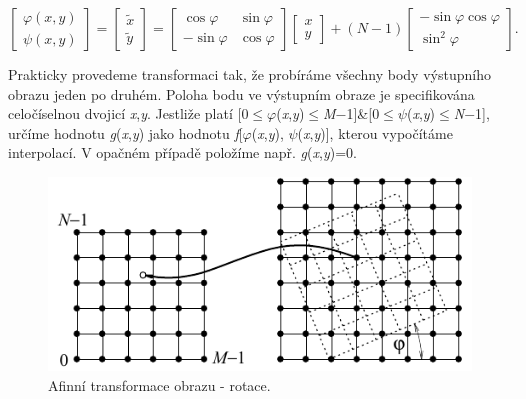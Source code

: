 \begin{equation}
    \left[\begin{array}{c} {\varphi \left(x,y\right)} \\ {\psi \left(x,y\right)} \end{array}\right]=\left[\begin{array}{c} {\tilde{x}} \\ {\tilde{y}} \end{array}\right]=\left[\begin{array}{cc} {\cos \varphi } & {\sin \varphi } \\ {-\sin \varphi } & {\cos \varphi } \end{array}\right]\left[\begin{array}{c} {x} \\ {y} \end{array}\right]+\left(N-1\right)\left[\begin{array}{c} {-\sin \varphi \cos \varphi } \\ {\sin ^{2} \varphi } \end{array}\right]. \nonumber
\end{equation}

Prakticky provedeme transformaci tak, že probíráme všechny body výstupního obrazu jeden po druhém. Poloha bodu ve výstupním obraze je specifikována celočíselnou dvojicí \textit{x},\textit{y}. Jestliže platí [0$\leq$$\varphi$(\textit{x},\textit{y})$\leq$\textit{M}$-$1]\&[0$\leq$$\psi$(\textit{x},\textit{y})$\leq$\textit{N}$-$1], určíme hodnotu \textit{g}(\textit{x},\textit{y}) jako hodnotu \textit{f}[$\varphi$(\textit{x},\textit{y}), $\psi$(\textit{x},\textit{y})], kterou vypočítáme interpolací. V opačném případě položíme např. \textit{g}(\textit{x},\textit{y})=0.

\begin{figure}[th]
    \begin{center}
        \includegraphics[scale=1.0]{06_bodoveoperace/images/img_6_5.pdf}
    \end{center}
    \caption{Afinní transformace obrazu - rotace.}
    \label{img:6_5}
\end{figure}


